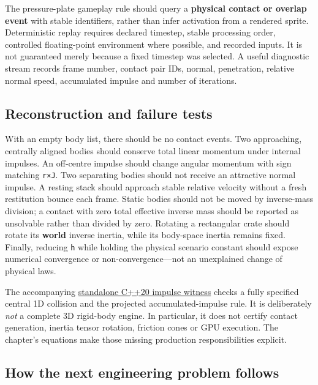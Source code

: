 The pressure-plate gameplay rule should query a \textbf{physical contact or overlap event} with stable identifiers, rather than infer activation from a rendered sprite. Deterministic replay requires declared timestep, stable processing order, controlled floating-point environment where possible, and recorded inputs. It is not guaranteed merely because a fixed timestep was selected. A useful diagnostic stream records frame number, contact pair IDs, normal, penetration, relative normal speed, accumulated impulse and number of iterations.

\subsection{Reconstruction and failure tests}\label{02-foundations-ii-ch039-reconstruction-and-failure-tests}

With an empty body list, there should be no contact events. Two approaching, centrally aligned bodies should conserve total linear momentum under internal impulses. An off-centre impulse should change angular momentum with sign matching \texttt{r×J}. Two separating bodies should not receive an attractive normal impulse. A resting stack should approach stable relative velocity without a fresh restitution bounce each frame. Static bodies should not be moved by inverse-mass division; a contact with zero total effective inverse mass should be reported as unsolvable rather than divided by zero. Rotating a rectangular crate should rotate its \textbf{world} inverse inertia, while its body-space inertia remains fixed. Finally, reducing \texttt{h} while holding the physical scenario constant should expose numerical convergence or non-convergence---not an unexplained change of physical laws.

The accompanying \hyperref[source-file-128143bcbfc7213e97eaefa4]{standalone C++20 impulse witness} checks a fully specified central 1D collision and the projected accumulated-impulse rule. It is deliberately \emph{not} a complete 3D rigid-body engine. In particular, it does not certify contact generation, inertia tensor rotation, friction cones or GPU execution. The chapter's equations make those missing production responsibilities explicit.

\subsection{How the next engineering problem follows}\label{02-foundations-ii-ch039-how-the-next-engineering-problem-follows}

